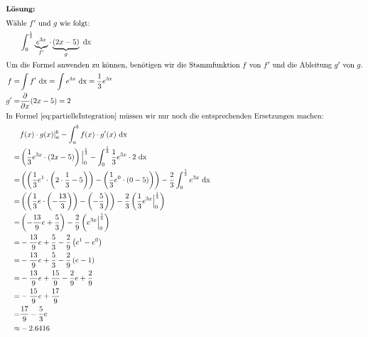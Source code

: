 \documentclass[11pt, a4paper]{article}
\providecommand{\dx}{\ \mathrm{dx}}
\providecommand\br[1]{\left(#1\right)}
\providecommand\ubr[2]{\underbrace{#1}_{#2}}
\begin{document}
\begin{align*}
	\intertext{\textbf{Lösung:}}
	\intertext{Wähle $f'$ und $g$ wie folgt:}
	& \int_\lowerBorder^\upperBorder \ubr{e^{3x}}{f'} \cdot \ubr{\br{2x - 5}}{g}\dx\\
	\intertext{Um die Formel anwenden zu können, benötigen wir die Stammfunktion $f$ von $f'$ und die Ableitung $g'$ von $g$.}
	f =&\int f' \dx
	=\int e^{3x} \dx
	=\frac{1}{3} e^{3x}\\
	g' =& \frac{\partial}{\partial x} (2x - 5)
	= 2\\
	\intertext{In Formel \eqref{eq:partielleIntegration} müssen wir nur noch die entsprechenden Ersetzungen machen:}
	&f(x) \cdot g(x)\vert_a^b - \int_a^b f(x) \cdot g'(x) \dx\\
	=& \br{\frac{1}{3} e^{3x} \cdot \br{2x - 5}}\Big\vert_\lowerBorder^\upperBorder - \int_\lowerBorder^\upperBorder \frac{1}{3} e^{3x} \cdot 2 \dx\\
	=& \br{\br{\frac{1}{3} e^1 \cdot \br{2\cdot \frac{1}{3} - 5}} - \br{\frac{1}{3}e^0 \cdot \br{0 - 5}}} - \frac{2}{3} \int_\lowerBorder^\upperBorder e^{3x} \dx\\
	=& \br{\br{\frac{1}{3}e \cdot \br{-\frac{13}{3}}} - \br{-\frac{5}{3}}} - \frac{2}{3}\br{\frac{1}{3}e^{3x}\Big\vert_\lowerBorder^\upperBorder}\\
	=& \br{-\frac{13}{9}e + \frac{5}{3}} - \frac{2}{9} \br{e^{3x}\Big\vert_\lowerBorder^\upperBorder}\\
	=& -\frac{13}{9}e + \frac{5}{3} - \frac{2}{9} \br{e^1 - e^0}\\
	=& -\frac{13}{9}e + \frac{5}{3} - \frac{2}{9} \br{e - 1}\\
	=& -\frac{13}{9}e + \frac{15}{9} - \frac{2}{9}e + \frac{2}{9}\\
	=& -\frac{15}{9}e + \frac{17}{9}\\
	=& \frac{17}{9} - \frac{5}{3}e\\
	\approx& -2.6416
\end{align*}
\end{document}
